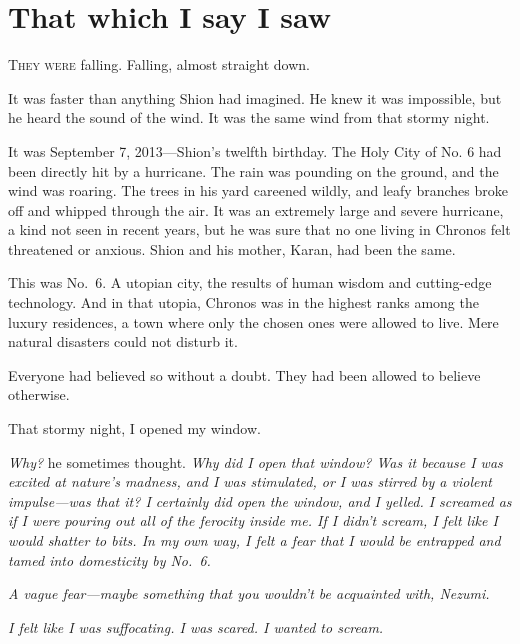 
\chapter{That which I say I saw}


\lettrine{T}{hey were} falling. Falling, almost straight down.

It was faster than anything Shion had imagined. He knew it was
impossible, but he heard the sound of the wind. It was the same wind
from that stormy night.

It was September 7, 2013---Shion's twelfth birthday. The Holy City of No.
6 had been directly hit by a hurricane. The rain was pounding on the
ground, and the wind was roaring. The trees in his yard careened wildly,
and leafy branches broke off and whipped through the air. It was an
extremely large and severe hurricane, a kind not seen in recent years,
but he was sure that no one living in Chronos felt threatened or
anxious. Shion and his mother, Karan, had been the same.

This was No.~6. A utopian city, the results of human wisdom and
cutting-edge technology. And in that utopia, Chronos was in the highest
ranks among the luxury residences, a town where only the chosen ones
were allowed to live. Mere natural disasters could not disturb it.

Everyone had believed so without a doubt. They had been allowed to
believe otherwise.

That stormy night, I opened my window.

\emph{Why?} he sometimes thought. \emph{Why did I open that window? Was it because I
was excited at nature's madness, and I was stimulated, or I was stirred
by a violent impulse---was that it? I certainly did open the window, and I
yelled. I screamed as if I were pouring out all of the ferocity inside
me. If I didn't scream, I felt like I would shatter to bits. In my own
way, I felt a fear that I would be entrapped and tamed into domesticity
by No.~6.}

\emph{A vague fear---maybe something that you wouldn't be acquainted with,
Nezumi.}

\emph{I felt like I was suffocating. I was scared. I wanted to scream.}


